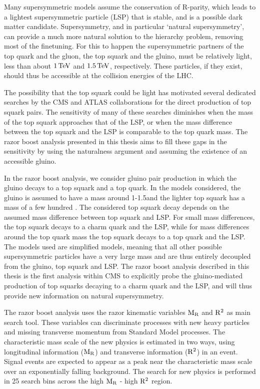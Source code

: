 Many supersymmetric models assume the conservation of R-parity, which leads to a lightest
supersymmetric particle (LSP) that is stable, and is a possible dark matter candidate. 
Supersymmetry, and in particular `natural supersymmetry', can provide a much more natural solution
to the hierarchy problem, removing most of the finetuning. For this to happen the supersymmetric
partners of the top quark and the gluon, the top squark and the gluino, must be relatively light,
less than about $1\,\text{Te\hspace{-.08em}V}$ and $1.5\,\text{Te\hspace{-.08em}V}$, respectively. These particles, if they exist, should thus be
accessible at the collision energies of the LHC. 


The possibility that the top squark could be light has motivated several dedicated searches by the
CMS and ATLAS collaborations for the direct production of top squark pairs. 
The sensitivity of many of these searches diminishes when the mass of the top squark approaches that
of the LSP, or when the mass difference between the top squark and the LSP is comparable to the top
quark mass. The razor boost analysis presented in this thesis aims to fill these gaps in the
sensitivity by using the naturalness argument and assuming the existence of an accessible gluino. 


In the razor boost analysis, we consider gluino pair production in which the gluino decays to a top
squark and a top quark. In the models considered, the gluino is assumed to have a mass around
1-1.5\TeV and the lighter top squark has a mass of a few hundred \GeV.
The considered top squark decay depends on the assumed mass difference between top squark and LSP.
For small mass differences, the top squark decays to a charm quark and the LSP, while for mass
differences around the top quark mass the top squark decays to a top quark and the LSP. 
The models used are simplified models, meaning that all other possible supersymmetric particles
have a very large mass and are thus entirely decoupled from the gluino, top squark and LSP. 
The razor boost analysis described in this thesis is the first analysis within CMS to explicitly
probe the gluino-mediated production of top squarks decaying to a charm quark and the LSP, and
will thus provide new information on natural supersymmetry. 


The razor boost analysis uses the razor kinematic variables $\mathrm{M_R}$ and $\mathrm{R^2}$ as main search tool.
These variables can discriminate processes with new heavy particles and missing transverse
momentum from Standard Model processes. The characteristic mass scale of the new physics is
estimated in two ways, using longitudinal information ($\mathrm{M_R}$) and transverse information ($\mathrm{R^2}$)
in an event. 
Signal events are expected to appear as a peak near the characteristic mass scale over an
exponentially falling background. 
The search for new physics is performed in 25 search bins across the high $\mathrm{M_R}$ - high $\mathrm{R^2}$
region. 


